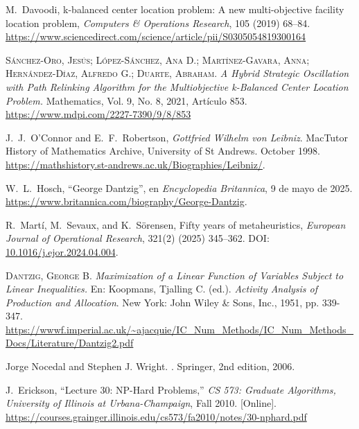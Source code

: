 \documentclass[12pt,a4paper]{book}
\begin{document}
\begin{thebibliography}{X}
    M.~Davoodi,
    k-balanced center location problem: A new multi-objective facility location problem,
    \textit{Computers \& Operations Research}, 105 (2019) 68--84.
    \url{https://www.sciencedirect.com/science/article/pii/S0305054819300164}

     \textsc{Sánchez-Oro, Jesús; López-Sánchez, Ana D.; Martínez-Gavara, Anna; Hernández-Díaz, Alfredo G.; Duarte, Abraham}. \textit{A Hybrid Strategic Oscillation with Path Relinking Algorithm for the Multiobjective k-Balanced Center Location Problem.} Mathematics, Vol. 9, No. 8, 2021, Artículo 853. \url{https://www.mdpi.com/2227-7390/9/8/853}

    J.~J.~O'Connor and E.~F.~Robertson,
    \textit{Gottfried Wilhelm von Leibniz}.
    MacTutor History of Mathematics Archive, University of St Andrews.
    October 1998.
    \url{https://mathshistory.st-andrews.ac.uk/Biographies/Leibniz/}.

    W.~L.~Hosch,
    ``George Dantzig'',
    en \textit{Encyclopedia Britannica}, 9 de mayo de 2025.
    \url{https://www.britannica.com/biography/George-Dantzig}.

    R.~Martí, M.~Sevaux, and K.~Sörensen,
    Fifty years of metaheuristics,
    \textit{European Journal of Operational Research}, 321(2) (2025) 345--362.
    DOI: \href{https://doi.org/10.1016/j.ejor.2024.04.004}{10.1016/j.ejor.2024.04.004}.

     \textsc{Dantzig, George B.} \textit{Maximization of a Linear Function of Variables Subject to Linear Inequalities.} En: Koopmans, Tjalling C. (ed.). \textit{Activity Analysis of Production and Allocation}. New York: John Wiley \& Sons, Inc., 1951, pp. 339-347. \url{https://wwwf.imperial.ac.uk/~ajacquie/IC_Num_Methods/IC_Num_Methods_Docs/Literature/Dantzig2.pdf}

    Jorge Nocedal and Stephen J. Wright.
    .
    \newblock Springer, 2nd edition, 2006.

    J.~Erickson, ``Lecture 30: NP-Hard Problems,'' \emph{CS 573: Graduate Algorithms, University of Illinois at Urbana-Champaign}, Fall 2010. [Online].
    \url{https://courses.grainger.illinois.edu/cs573/fa2010/notes/30-nphard.pdf}


\end{thebibliography}
\end{document}
